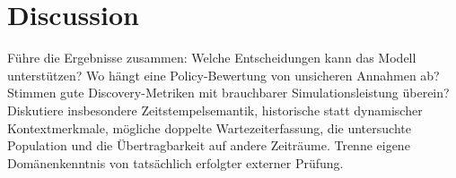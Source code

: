 \chapter{Discussion}
\label{chap:discussion}

Führe die Ergebnisse zusammen: Welche Entscheidungen kann das Modell unterstützen? Wo hängt eine Policy-Bewertung von unsicheren Annahmen ab? Stimmen gute Discovery-Metriken mit brauchbarer Simulationsleistung überein?
Diskutiere insbesondere Zeitstempelsemantik, historische statt dynamischer Kontextmerkmale, mögliche doppelte Wartezeiterfassung, die untersuchte Population und die Übertragbarkeit auf andere Zeiträume. Trenne eigene Domänenkenntnis von tatsächlich erfolgter externer Prüfung.